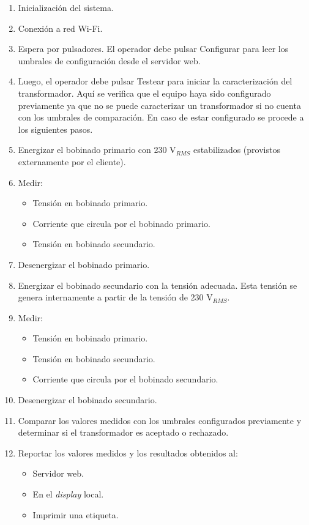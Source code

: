\begin{enumerate}
\item Inicialización del sistema.
\item Conexión a red Wi-Fi.
\item Espera por pulsadores. El operador debe pulsar Configurar para leer los umbrales de configuración desde el servidor web.
\item Luego, el operador debe pulsar Testear para iniciar la caracterización del transformador. Aquí se verifica que el equipo haya sido configurado previamente ya que no se puede caracterizar un transformador si no cuenta con los umbrales de comparación. En caso de estar configurado se procede a los siguientes pasos.
\item Energizar el bobinado primario con 230 V$_{RMS}$ estabilizados (provistos externamente por el cliente).
\item Medir:
\begin{itemize}
	\item Tensión en bobinado primario.
	\item Corriente que circula por el bobinado primario.
	\item Tensión en bobinado secundario.
\end{itemize}
\item Desenergizar el bobinado primario.
\item Energizar el bobinado secundario con la tensión adecuada. Esta tensión se genera internamente a partir de la tensión de 230 V$_{RMS}$.
\item Medir:
\begin{itemize}
	\item Tensión en bobinado primario.
	\item Tensión en bobinado secundario.
	\item Corriente que circula por el bobinado secundario.
\end{itemize}
\item Desenergizar el bobinado secundario.
\item Comparar los valores medidos con los umbrales configurados previamente y determinar si el transformador es aceptado o rechazado.
\item Reportar los valores medidos y los resultados obtenidos al:
\begin{itemize}
	\item Servidor web.
	\item En el \textit{display} local.
	\item Imprimir una etiqueta.
\end{itemize}
\end{enumerate}


